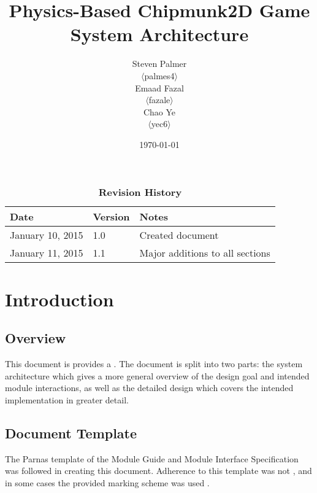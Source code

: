 \documentclass[12pt, titlepage]{article}
\begin{document}
\title{\bf Physics-Based Chipmunk2D Game\\[\baselineskip]\Large System Architecture}
\author{Steven Palmer\\$\langle$palmes4$\rangle$\\Emaad Fazal\\$\langle$fazale$\rangle$\\Chao Ye\\$\langle$yec6$\rangle$}
\date{\today}
	
\maketitle

\tableofcontents
\listoftables
\listoffigures


\begin{table}[bp]
\caption*{\bf Revision History}
\begin{tabularx}{\textwidth}{p{3.5cm}p{2cm}X}
\toprule {\bf Date} & {\bf Version} & {\bf Notes}\\
\midrule
January 10, 2015 & 1.0 & Created document\\
January 11, 2015 & 1.1 & Major additions to all sections\\
\bottomrule
\end{tabularx}
\end{table}

\newpage


\section{Introduction}
\subsection{Overview}
This document is provides a  .  The document is split into two parts:  the system architecture which gives a more general overview of the design goal and intended module interactions, as well as the detailed design which covers the intended implementation in greater detail.



\subsection{Document Template}
The Parnas template of the Module Guide and Module Interface Specification was followed in creating this document.  Adherence to this template was not , and in some cases the provided marking scheme was used .
\end{document}
